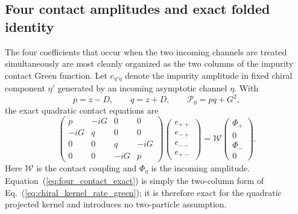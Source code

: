 \documentclass[%
  aps,prb,reprint,amsmath,amssymb,superscriptaddress,longbibliography,floatfix
]{revtex4-2}
\begin{document}
\subsection{Four contact amplitudes and exact folded identity}
\label{app:four_contact_exact}

The four coefficients that occur when the two incoming channels are treated
simultaneously are most cleanly organized as the two columns of the impurity
contact Green function.  Let $e_{\eta'\eta}$ denote the impurity amplitude in
fixed chiral component $\eta'$ generated by an incoming asymptotic channel
$\eta$.  With
\begin{equation}
p=z-D,\qquad q=z+D,\qquad
\mathcal P_0=pq+G^2 ,
\label{eq:contact_pq}
\end{equation}
the exact quadratic contact equations are
\begin{equation}
\begin{pmatrix}
p&-iG&0&0\\
-iG&q&0&0\\
0&0&q&-iG\\
0&0&-iG&p
\end{pmatrix}
\begin{pmatrix}
e_{++}\\e_{-+}\\e_{--}\\e_{+-}
\end{pmatrix}
=\mathcal W
\begin{pmatrix}
\Phi_+\\0\\\Phi_-\\0
\end{pmatrix}.
\label{eq:four_contact_exact}
\end{equation}
Here $\mathcal W$ is the contact coupling and $\Phi_\eta$ is the incoming
amplitude.  Equation~(\ref{eq:four_contact_exact}) is simply the two-column
form of Eq.~(\ref{eq:chiral_kernel_rate_green}); it is therefore exact for
the quadratic projected kernel and introduces no two-particle assumption.
\end{document}
